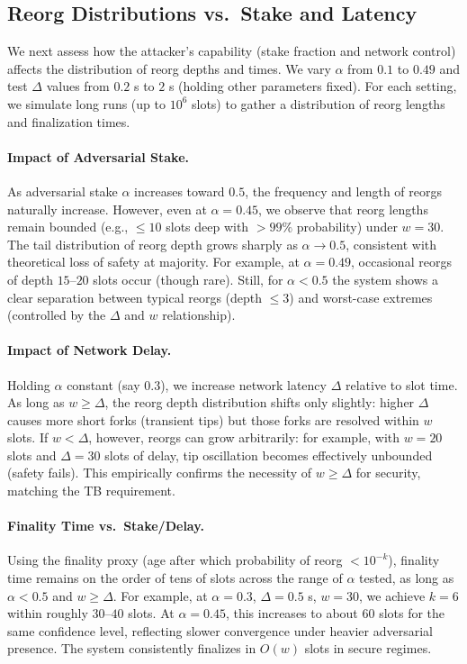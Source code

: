 \subsection{Reorg Distributions vs.\ Stake and Latency}
We next assess how the attacker’s capability (stake fraction and network control) affects the distribution of reorg depths and times. We vary $\alpha$ from $0.1$ to $0.49$ and test $\Delta$ values from $0.2$ s to $2$ s (holding other parameters fixed). For each setting, we simulate long runs (up to $10^6$ slots) to gather a distribution of reorg lengths and finalization times.

\paragraph{Impact of Adversarial Stake.}
As adversarial stake $\alpha$ increases toward $0.5$, the frequency and length of reorgs naturally increase. However, even at $\alpha=0.45$, we observe that reorg lengths remain bounded (e.g., $\le 10$ slots deep with $>99\%$ probability) under $w=30$. The tail distribution of reorg depth grows sharply as $\alpha\to 0.5$, consistent with theoretical loss of safety at majority. For example, at $\alpha=0.49$, occasional reorgs of depth $15$--$20$ slots occur (though rare). Still, for $\alpha < 0.5$ the system shows a clear separation between typical reorgs (depth $\le 3$) and worst-case extremes (controlled by the $\Delta$ and $w$ relationship).

\paragraph{Impact of Network Delay.}
Holding $\alpha$ constant (say $0.3$), we increase network latency $\Delta$ relative to slot time. As long as $w \ge \Delta$, the reorg depth distribution shifts only slightly: higher $\Delta$ causes more short forks (transient tips) but those forks are resolved within $w$ slots. If $w < \Delta$, however, reorgs can grow arbitrarily: for example, with $w=20$ slots and $\Delta=30$ slots of delay, tip oscillation becomes effectively unbounded (safety fails). This empirically confirms the necessity of $w \ge \Delta$ for security, matching the TB requirement.

\paragraph{Finality Time vs.\ Stake/Delay.}
Using the finality proxy (age after which probability of reorg $<10^{-k}$), finality time remains on the order of tens of slots across the range of $\alpha$ tested, as long as $\alpha < 0.5$ and $w \ge \Delta$. For example, at $\alpha=0.3$, $\Delta=0.5$ s, $w=30$, we achieve $k=6$ within roughly $30$--$40$ slots. At $\alpha=0.45$, this increases to about $60$ slots for the same confidence level, reflecting slower convergence under heavier adversarial presence. The system consistently finalizes in $O(w)$ slots in secure regimes.


